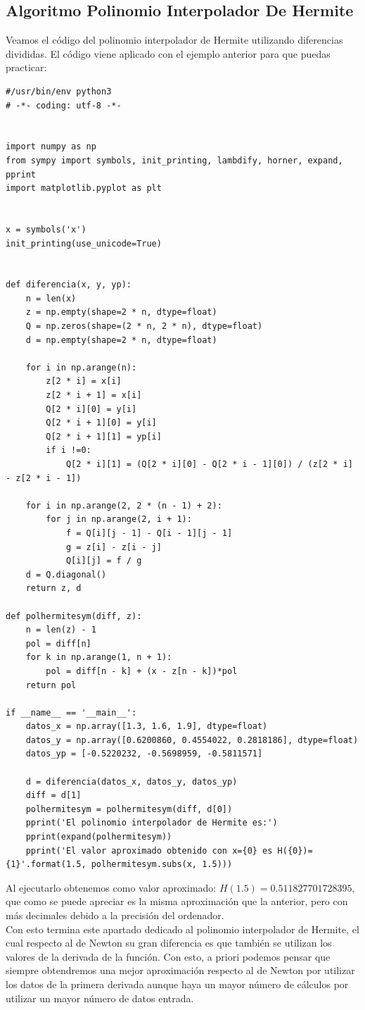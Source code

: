 \documentclass[12pt,a4paper,oneside]{scrbook}
\newcounter{ns}
\begin{document}
\subsection*{Algoritmo Polinomio Interpolador De Hermite}
Veamos el código del polinomio interpolador de Hermite utilizando diferencias divididas. El código viene aplicado con el ejemplo anterior para que puedas practicar:
\begin{lstlisting}[frame=none]
#/usr/bin/env python3
# -*- coding: utf-8 -*-


import numpy as np
from sympy import symbols, init_printing, lambdify, horner, expand, pprint
import matplotlib.pyplot as plt


x = symbols('x')
init_printing(use_unicode=True)


def diferencia(x, y, yp):
    n = len(x)
    z = np.empty(shape=2 * n, dtype=float)
    Q = np.zeros(shape=(2 * n, 2 * n), dtype=float)
    d = np.empty(shape=2 * n, dtype=float)

    for i in np.arange(n):
        z[2 * i] = x[i]
        z[2 * i + 1] = x[i]
        Q[2 * i][0] = y[i]
        Q[2 * i + 1][0] = y[i]
        Q[2 * i + 1][1] = yp[i]
        if i !=0:
            Q[2 * i][1] = (Q[2 * i][0] - Q[2 * i - 1][0]) / (z[2 * i] - z[2 * i - 1])

    for i in np.arange(2, 2 * (n - 1) + 2):
        for j in np.arange(2, i + 1):
            f = Q[i][j - 1] - Q[i - 1][j - 1]
            g = z[i] - z[i - j]
            Q[i][j] = f / g
    d = Q.diagonal()
    return z, d

def polhermitesym(diff, z):
    n = len(z) - 1
    pol = diff[n]
    for k in np.arange(1, n + 1):
        pol = diff[n - k] + (x - z[n - k])*pol
    return pol

if __name__ == '__main__':    
    datos_x = np.array([1.3, 1.6, 1.9], dtype=float)
    datos_y = np.array([0.6200860, 0.4554022, 0.2818186], dtype=float)
    datos_yp = [-0.5220232, -0.5698959, -0.5811571]

    d = diferencia(datos_x, datos_y, datos_yp)
    diff = d[1]
    polhermitesym = polhermitesym(diff, d[0])
    pprint('El polinomio interpolador de Hermite es:')
    pprint(expand(polhermitesym))
    pprint('El valor aproximado obtenido con x={0} es H({0})={1}'.format(1.5, polhermitesym.subs(x, 1.5)))
\end{lstlisting}
Al ejecutarlo obtenemos como valor aproximado: $H(1.5)=0.511827701728395$, que como se puede apreciar es la misma aproximación que la anterior, pero con más decimales debido a la precisión del ordenador.\\
Con esto termina este apartado dedicado al polinomio interpolador de Hermite, el cual respecto al de Newton su gran diferencia es que también se utilizan los valores de la derivada de la función. Con esto, a priori podemos pensar que siempre obtendremos una mejor aproximación respecto al de Newton por utilizar los datos de la primera derivada aunque haya un mayor número de cálculos por utilizar un mayor número de datos entrada.
\end{document}
